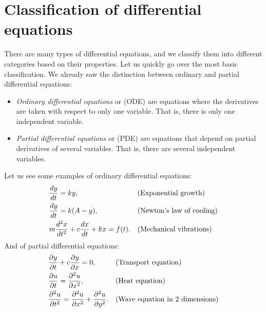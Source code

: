 \section{Classification of differential equations}
\label{classification:section}




There are many types of differential equations, and we classify them into
different categories based on their properties.  Let us quickly go over
the most basic classification.  We already saw the distinction
between ordinary and partial differential equations:

\begin{definition}
\begin{itemize}
\item
\emph{Ordinary differential equations}
 or (ODE) are
equations where the derivatives are taken with respect to only one variable.
That is, there is only one independent variable.
\item
\emph{Partial differential equations}
 or (PDE) are
equations that depend on partial derivatives of several variables.
That is, there are several independent variables.
\end{itemize}
\end{definition}

Let us see some examples of ordinary differential equations:
\begin{align*}
& \frac{d y}{dt} = ky , & & \text{(Exponential growth\index{exponential growth})} \\
& \frac{d y}{dt} = k(A-y) , & & \text{(\myindex{Newton's law of cooling})} \\
& m \frac{d^2 x}{dt^2} + c \frac{dx}{dt} + kx = f(t) . & &
\text{(Mechanical vibrations\index{mechanical vibrations})}
\end{align*}
And of partial differential equations:
\begin{align*}
& \frac{\partial y}{\partial t} + c \frac{\partial y}{\partial x} = 0 , & & 
\text{(Transport equation\index{transport equation})} \\
& \frac{\partial u}{\partial t} = \frac{\partial^2 u}{\partial x^2} , & & 
\text{(Heat equation\index{heat equation})} \\
& \frac{\partial^2 u}{\partial t^2} = \frac{\partial^2 u}{\partial x^2} +
\frac{\partial^2 u}{\partial y^2} . & & 
\text{(Wave equation in 2 dimensions\index{wave equation in 2 dimensions})}
\end{align*}

